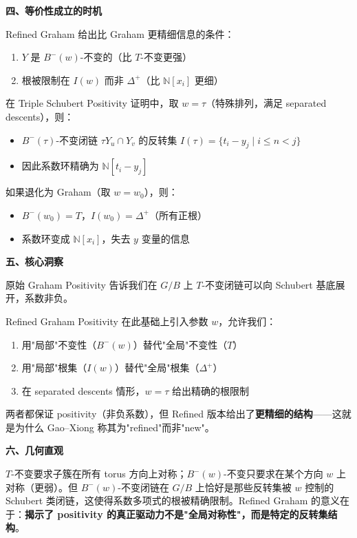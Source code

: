 \textbf{四、等价性成立的时机}

Refined Graham 给出比 Graham 更精细信息的条件：
\begin{enumerate}
\item $Y$ 是 $B^-(w)$-不变的（比 $T$-不变更强）
\item 根被限制在 $I(w)$ 而非 $\Delta^+$（比 $\mathbb{N}[x_i]$ 更细）
\end{enumerate}

在 Triple Schubert Positivity 证明中，取 $w = \tau$（特殊排列，满足 separated descents），则：
\begin{itemize}
\item $B^-(\tau)$-不变闭链 $\tau Y_u \cap Y_v$ 的反转集 $I(\tau) = \{t_i - y_j \mid i \leq n < j\}$
\item 因此系数环精确为 $\mathbb{N}[t_i - y_j]$
\end{itemize}

如果退化为 Graham（取 $w = w_0$），则：
\begin{itemize}
\item $B^-(w_0) = T$，$I(w_0) = \Delta^+$（所有正根）
\item 系数环变成 $\mathbb{N}[x_i]$，失去 $y$ 变量的信息
\end{itemize}

\textbf{五、核心洞察}

原始 Graham Positivity 告诉我们在 $G/B$ 上 $T$-不变闭链可以向 Schubert 基底展开，系数非负。

Refined Graham Positivity 在此基础上引入参数 $w$，允许我们：
\begin{enumerate}
\item 用"局部"不变性（$B^-(w)$）替代"全局"不变性（$T$）
\item 用"局部"根集（$I(w)$）替代"全局"根集（$\Delta^+$）
\item 在 separated descents 情形，$w = \tau$ 给出精确的根限制
\end{enumerate}

两者都保证 positivity（非负系数），但 Refined 版本给出了\textbf{更精细的结构}——这就是为什么 Gao--Xiong \cite{GX2025} 称其为"refined"而非"new"。

\textbf{六、几何直观}

$T$-不变要求子簇在所有 torus 方向上对称；$B^-(w)$-不变只要求在某个方向 $w$ 上对称（更弱）。但 $B^-(w)$-不变闭链在 $G/B$ 上恰好是那些反转集被 $w$ 控制的 Schubert 类闭链，这使得系数多项式的根被精确限制。Refined Graham 的意义在于：\textbf{揭示了 positivity 的真正驱动力不是"全局对称性"，而是特定的反转集结构}。

